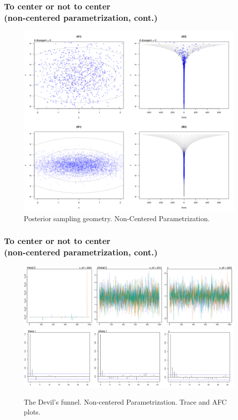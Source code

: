 \documentclass[arial,12pt,xcolor=dvipsnames]{beamer}
\begin{document}
%
\begin{frame}
	\frametitle{To center or not to center \\
		(non-centered parametrization, cont.)}
	\begin{figure}[h]
		\centering
		\includegraphics[width=0.65\linewidth]{3_funnel_NC}
		\caption{Posterior sampling geometry. Non-Centered Parametrization.}
		\label{fig:devil_NC_geom}
	\end{figure}
\end{frame}
%
\begin{frame}
	\frametitle{To center or not to center \\
		(non-centered parametrization, cont.)}
	\begin{figure}[h] 
		\centering
			\includegraphics[width=0.9\linewidth]{3_trace_NC}
			\includegraphics[width=0.93\linewidth]{3_acf_NC}
		\caption{The Devil's funnel. Non-centered Parametrization. Trace and AFC plots.}
		\label{fig:devil_NC}
	\end{figure}
\end{frame}
\end{document}
